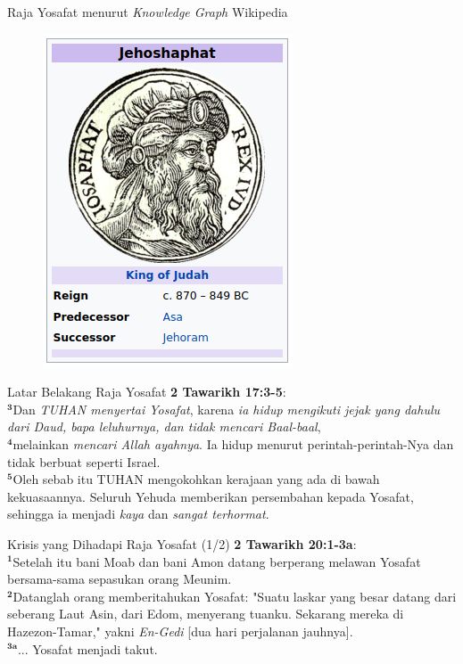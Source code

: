 \documentclass[pdf]{beamer}
\theoremstyle{mystyle}
\begin{document}
\begin{frame}{Raja Yosafat menurut \textit{Knowledge Graph} Wikipedia}
	\begin{figure}[!ht]
		\centering
		\includegraphics[scale=0.5]{raja-yosafat-wiki}
	\end{figure}
\end{frame}

\begin{frame}{Latar Belakang Raja Yosafat}
	\textbf{2 Tawarikh 17:3-5}: \\
	$^{\bm{3}}$Dan \textit{TUHAN menyertai Yosafat}, karena \textit{ia hidup mengikuti jejak yang dahulu dari Daud, bapa leluhurnya, dan tidak mencari Baal-baal}, \\
	$^{\bm{4}}$melainkan \textit{mencari Allah ayahnya}. Ia hidup menurut perintah-perintah-Nya dan tidak berbuat seperti Israel.\\
	$^{\bm{5}}$Oleh sebab itu TUHAN mengokohkan kerajaan yang ada di bawah kekuasaannya. Seluruh Yehuda memberikan persembahan kepada Yosafat, sehingga ia menjadi \textit{kaya} dan \textit{sangat terhormat}.
\end{frame}

\begin{frame}{Krisis yang Dihadapi Raja Yosafat (1/2)}
	\textbf{2 Tawarikh 20:1-3a}: \\	
	$^{\bm{1}}$Setelah itu bani Moab dan bani Amon datang berperang melawan Yosafat bersama-sama sepasukan orang Meunim. \\
	$^{\bm{2}}$Datanglah orang memberitahukan Yosafat: "Suatu laskar yang besar datang dari seberang Laut Asin, dari Edom, menyerang tuanku. Sekarang mereka di Hazezon-Tamar," yakni \textit{En-Gedi} [dua hari perjalanan jauhnya]. \\
	$^{\bm{3a}}$... Yosafat menjadi takut.
\end{frame}
\end{document}
